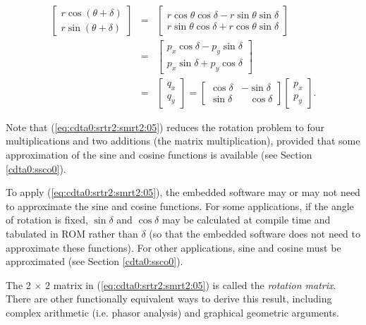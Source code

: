 \begin{eqnarray}
\label{eq:cdta0:srtr2:smrt2:03}
\left[\begin{array}{c}r \cos (\theta + \delta)\\r \sin (\theta+\delta)\end{array}\right]
& = &
\left[\begin{array}{c}r \cos \theta \cos \delta - r \sin \theta \sin \delta \\
                      r \sin \theta \cos \delta + r \cos \theta \sin \delta \end{array}\right] \\
\label{eq:cdta0:srtr2:smrt2:04}
& = & 
\left[\begin{array}{c}p_x \cos \delta - p_y \sin \delta \\
                      p_x \sin \delta + p_y \cos \delta \end{array}\right] \\
\label{eq:cdta0:srtr2:smrt2:05}
& = & 
\left[\begin{array}{c}q_x\\q_y\end{array}\right]
=
\left[\begin{array}{cc}\cos \delta & - \sin \delta \\
                       \sin \delta & \;\;\;\cos \delta \end{array}\right]
\left[\begin{array}{c}p_x\\p_y\end{array}\right] .
\end{eqnarray}

\noindent{}Note that (\ref{eq:cdta0:srtr2:smrt2:05})
reduces the rotation problem to four multiplications and two additions
(the matrix multiplication), provided that some approximation of the sine
and cosine functions is available (see Section \ref{cdta0:ssco0}).  

To apply (\ref{eq:cdta0:srtr2:smrt2:05}), the embedded software
may or may not need to approximate the sine and cosine functions.
For some applications, if the angle of rotation is fixed, 
$\sin \delta$ and
$\cos \delta$ may be calculated at compile time and tabulated in 
ROM rather than $\delta$ (so that the embedded software does not need
to approximate these functions).  For other applications,
sine and cosine must be approximated (see Section \ref{cdta0:ssco0}).

The 2 $\times$ 2 matrix in (\ref{eq:cdta0:srtr2:smrt2:05})
is called the \emph{rotation matrix}.  There are
other functionally equivalent ways to derive this result, including complex
arithmetic (i.e. phasor analysis) and graphical geometric arguments.


